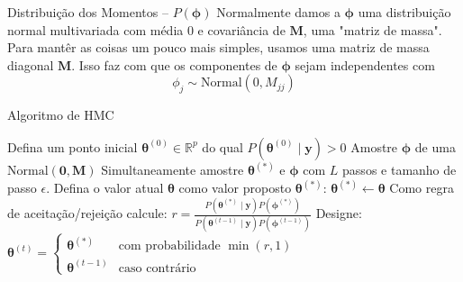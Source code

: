 \begin{frame}{Distribuição dos Momentos -- $P(\boldsymbol{\phi})$}
  Normalmente damos a $\boldsymbol{\phi}$ uma distribuição normal multivariada
  com média 0 e covariância de $\mathbf{M}$,
  uma "matriz de massa".
  \vfill
  Para mantêr as coisas um pouco mais simples, usamos uma matriz de massa diagonal
  $\mathbf{M}$. Isso faz com que os componentes de $\boldsymbol{\phi}$ sejam
  independentes com
  $$\phi_j \sim \text{Normal}(0, M_{jj})$$
\end{frame}

\begin{frame}[fragile]{Algoritmo de HMC}
    \SetAlCapFnt{\normalsize}
    \SetAlCapNameFnt{\normalsize}
    \begin{algorithm}[H]
    \DontPrintSemicolon
    \SetAlgoNoEnd
    \SetAlgoLined
    \footnotesize
    Defina um ponto inicial $\boldsymbol{\theta}^{(0)} \in \mathbb{R}^p$ do qual $P\left(\boldsymbol{\theta}^{(0)} \mid \boldsymbol{y} \right) > 0$\;
    Amostre $\boldsymbol{\phi}$ de uma $\text{Normal}(\mathbf{0},\mathbf{M})$\;
    Simultaneamente amostre $\boldsymbol{\theta}^{(*)}$ e $\boldsymbol{\phi}$ com $L$ passos e tamanho de passo $\epsilon$.\;
    Defina o valor atual $\boldsymbol{\theta}$ como valor proposto $\boldsymbol{\theta}^{(*)}$:
    $\boldsymbol{\theta}^{(*)} \leftarrow \boldsymbol{\theta}$\;
    Como regra de aceitação/rejeição calcule:
    $r = \frac{P \left(\boldsymbol{\theta}^{(*)} \mid \boldsymbol{y} \right) P \left(\boldsymbol{\phi}^{(*)} \right)}{P \left(\boldsymbol{\theta}^{(t-1)} \mid \boldsymbol{y} \right) P \left(\boldsymbol{\phi}^{(t-1)} \right)}$\;
    Designe:
      $
        \boldsymbol{\theta}^{(t)} =
          \begin{cases}
          \boldsymbol{\theta}^{(*)} & \text{com probabilidade $\min(r,1)$}\\
          \boldsymbol{\theta}^{(t-1)} & \text{caso contrário}
        \end{cases}
      $\;
    \caption{Hamiltonian Monte Carlo (HMC)}
    \end{algorithm}
\end{frame}

